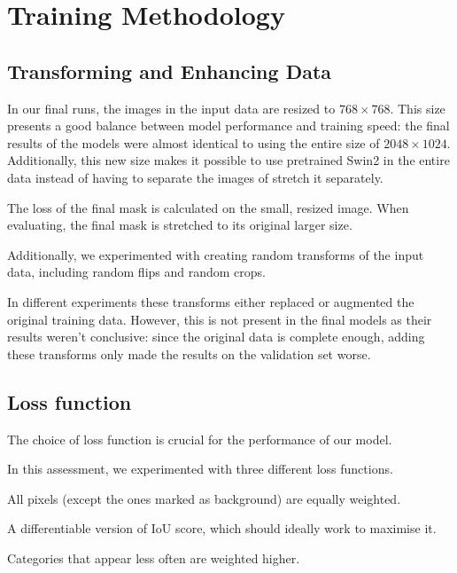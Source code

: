 \section{Training Methodology}

\subsection{Transforming and Enhancing Data}
In our final runs, the images in the input data are resized to $768 \times 768$.
This size presents a good balance between model performance and training speed: the final results of the models were almost identical to using the entire size of $2048 \times 1024$.
Additionally, this new size makes it possible to use pretrained Swin2 in the entire data instead of having to separate the images of stretch it separately.

The loss of the final mask is calculated on the small, resized image.
When evaluating, the final mask is stretched to its original larger size.

Additionally, we experimented with creating random transforms of the input data, including random flips and random crops.

In different experiments these transforms either replaced or augmented the original training data.
However, this is not present in the final models as their results weren't conclusive: since the original data is complete enough, adding these transforms only made the results on the validation set worse.

\subsection{Loss function}

The choice of loss function is crucial for the performance of our model.

In this assessment, we experimented with three different loss functions.

\begin{description}[style=nextline]
	\item[Categorical Cross-Entropy Loss] All pixels (except the ones marked as background) are equally weighted.
	\item[Intersection over Union Loss] A differentiable version of IoU score, which should ideally work to maximise it.
	\item[Dice Loss] Categories that appear less often are weighted higher\cite{dice_loss}.
\end{description}

